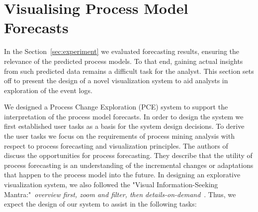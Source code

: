 \section{Visualising Process Model Forecasts}\label{sec:visualisation}




In the Section~\ref{sec:experiment} we evaluated forecasting results, ensuring the relevance of the predicted process models. To that end, gaining actual insights from such predicted data remains a difficult task for the analyst. This section sets off to present the design of a novel visualization system to aid analysts in exploration of the event logs.


We designed a Process Change Exploration (PCE) system to support the interpretation of the process model forecasts. In order to design the system we first established user tasks as a basis for the system design decisions. To derive the user tasks we focus on the requirements of process mining analysis with respect to process forecasting and visualization principles. The authors of~\cite{DBLP:conf/bpm/PollPRRR18} discuss the opportunities for process forecasting. They describe that the utility of process forecasting is an understanding of the incremental changes or adaptations that happen to the process model into the future. In designing an explorative visualization system, we also followed the "Visual Information-Seeking Mantra:"~\emph{overview first, zoom and filter, then details-on-demand}~\cite{DBLP:conf/vl/Shneiderman96}. 
Thus, we expect the design of our system to assist in the following tasks:


